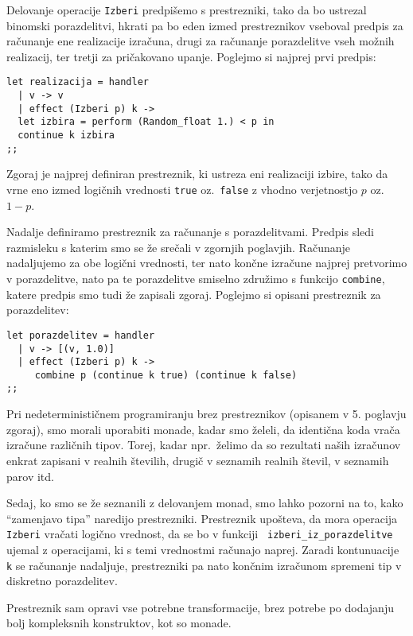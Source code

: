 \documentclass[a4paper,12pt]{article}
\theoremstyle{definition} %
\begin{document}
Delovanje operacije \lstinline{Izberi} predpišemo s prestrezniki, tako da bo ustrezal binomski porazdelitvi, hkrati pa bo eden izmed prestreznikov vseboval predpis za računanje ene realizacije izračuna, drugi za računanje porazdelitve vseh možnih realizacij, ter tretji za pričakovano upanje. Poglejmo si najprej prvi predpis:
\begin{lstlisting}
let realizacija = handler
  | v -> v
  | effect (Izberi p) k ->
  let izbira = perform (Random_float 1.) < p in
  continue k izbira
;;
\end{lstlisting}
Zgoraj je najprej definiran prestreznik, ki ustreza eni realizaciji izbire, tako da vrne eno izmed logičnih vrednosti \lstinline{true} oz.\ \lstinline{false} z vhodno verjetnostjo $p$ oz.\ $1 - p$.

Nadalje definiramo prestreznik za računanje s porazdelitvami. Predpis sledi razmisleku s katerim smo se že srečali v zgornjih poglavjih. Računanje nadaljujemo za obe logični vrednosti, ter nato končne izračune najprej pretvorimo v porazdelitve, nato pa te porazdelitve smiselno združimo s funkcijo \lstinline{combine}, katere predpis smo tudi že zapisali zgoraj. Poglejmo si opisani prestreznik za porazdelitev:
\begin{lstlisting}
let porazdelitev = handler
  | v -> [(v, 1.0)]
  | effect (Izberi p) k -> 
     combine p (continue k true) (continue k false)
;;
\end{lstlisting}
Pri nedeterminističnem programiranju brez prestreznikov (opisanem v 5. poglavju zgoraj), smo morali uporabiti monade, kadar smo želeli, da identična koda vrača izračune različnih tipov. Torej, kadar npr.\ želimo da so rezultati naših izračunov enkrat zapisani v realnih številih, drugič v seznamih realnih števil, v seznamih parov itd. 

Sedaj, ko smo se že seznanili z delovanjem monad, smo lahko pozorni na to, kako "`zamenjavo tipa"' naredijo prestrezniki. Prestreznik upošteva, da mora operacija \lstinline{Izberi} vračati logično vrednost, da se bo v funkciji \lstinline{ izberi_iz_porazdelitve } ujemal z operacijami, ki s temi vrednostmi računajo naprej. Zaradi kontunuacije \lstinline{k} se računanje nadaljuje, prestrezniki pa nato končnim izračunom spremeni tip v diskretno porazdelitev. 

Prestreznik sam opravi vse potrebne transformacije, brez potrebe po dodajanju bolj kompleksnih konstruktov, kot so monade. \\
\end{document}

